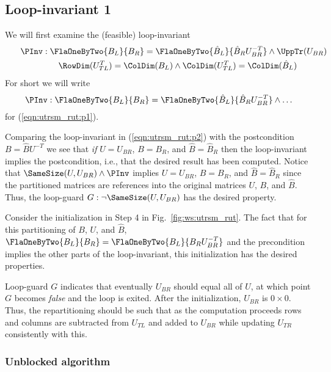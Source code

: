 \subsection{Loop-invariant 1}

We will first examine the (feasible) loop-invariant
\begin{eqnarray}
\label{eqn:utrsm_rut:p1}
\PInv: 
\lefteqn{
\FlaOneByTwo{ B_L }{ B_R } =
\FlaOneByTwo{ \hat{B}_{L} }
            { \hat{B}_R U_{BR}^{-T} }
\wedge
\UppTr( U_{BR} ) } \\ %
\nonumber
& & 
\RowDim( U_{TL}^T ) = \ColDim( {B}_L ) 
\wedge
\ColDim( U_{TL}^T ) = \ColDim( \hat{B}_L ) 
\end{eqnarray}
For short we will write
\begin{equation}
\label{eqn:utrsm_rut:p2}
\PInv: \FlaOneByTwo{ B_L}{B_R} =
\FlaOneByTwo{ \hat{B}_{L} }
            { \hat{B}_R U_{BR}^{-T} }
\wedge
\ldots
\end{equation}
for (\ref{eqn:utrsm_rut:p1}).

Comparing the loop-invariant in (\ref{eqn:utrsm_rut:p2}) with the
postcondition $ B = \hat{B} U^{-T} $ we see that {\em if} $ U = U_{BR} $, 
$ B = B_R $, and $ \hat{B} = \hat{B}_R $ then the loop-invariant implies 
the postcondition, i.e., that the desired result has been computed.
Notice that $ \SameSize( U, U_{BR} ) \wedge \PInv $ implies $ U =
U_{BR} $, $ B = B_R $, and $ \hat{B} = \hat{B}_R $ since the partitioned
matrices are references into the original matrices $ U $, $ B $, and $ \hat{B} $.  
Thus, the loop-guard $ G: \neg \SameSize( U, U_{BR} ) $ has the 
desired property.

Consider the initialization in Step 4 in Fig.~\ref{fig:ws:utrsm_rut}.
The fact that for this partitioning of $ B $, $ U $, and $ \hat{B} $,
$
\FlaOneByTwo{ B_L}{B_R} =
\FlaOneByTwo{ B_{L} }
            { B_R U_{BR}^{-T} }
$
and the precondition implies the
other parts of the loop-invariant, this initialization has the desired
properties.

Loop-guard $ G $ indicates that eventually $ U_{BR} $ should equal all
of $ U $, at which point $ G $ becomes {\em false} and the loop is
exited.  After the initialization, $ U_{BR} $ is $ 0 \times 0 $.
Thus, the repartitioning should be such that as the computation
proceeds rows and columns are subtracted from $ U_{TL} $ and added to
$ U_{BR} $ while updating $ U_{TR} $ consistently with this.

\subsubsection{Unblocked algorithm}

